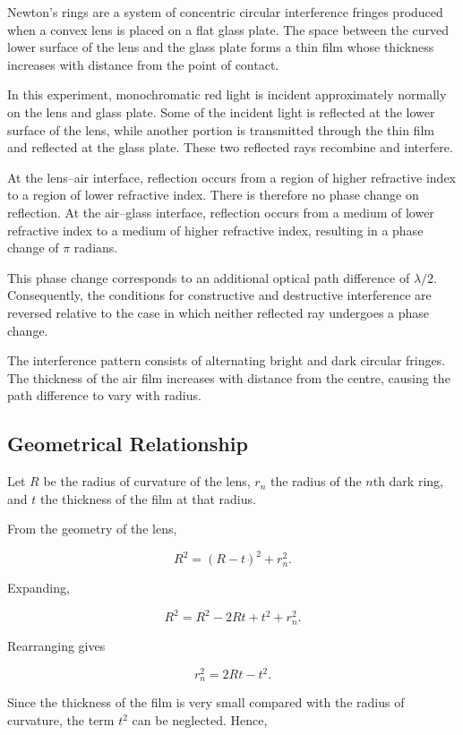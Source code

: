 \documentclass[12pt,a4paper]{article}
\begin{document}
Newton's rings are a system of concentric circular
interference fringes produced when a convex lens is
placed on a flat glass plate. The space between the
curved lower surface of the lens and the glass plate
forms a thin film whose thickness increases with
distance from the point of contact.

In this experiment, monochromatic red light is
incident approximately normally on the lens and
glass plate. Some of the incident light is reflected
at the lower surface of the lens, while another
portion is transmitted through the thin film and
reflected at the glass plate. These two reflected
rays recombine and interfere.

At the lens--air interface, reflection occurs from
a region of higher refractive index to a region of
lower refractive index. There is therefore no phase
change on reflection. At the air--glass interface,
reflection occurs from a medium of lower refractive
index to a medium of higher refractive index,
resulting in a phase change of $\pi$ radians.

This phase change corresponds to an additional
optical path difference of $\lambda/2$. Consequently,
the conditions for constructive and destructive
interference are reversed relative to the case in
which neither reflected ray undergoes a phase change.

The interference pattern consists of alternating
bright and dark circular fringes. The thickness of
the air film increases with distance from the centre,
causing the path difference to vary with radius. \cite{hecht}

\subsection{Geometrical Relationship}

Let $R$ be the radius of curvature of the lens,
$r_n$ the radius of the $n$th dark ring, and $t$
the thickness of the film at that radius.

From the geometry of the lens,

\[
R^2=(R-t)^2+r_n^2.
\]

Expanding,

\[
R^2=R^2-2Rt+t^2+r_n^2.
\]

Rearranging gives

\[
r_n^2=2Rt-t^2.
\]

Since the thickness of the film is very small
compared with the radius of curvature, the term
$t^2$ can be neglected. Hence,
\end{document}
